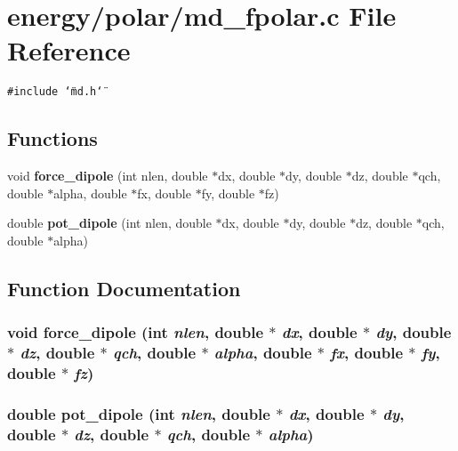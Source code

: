 \section{energy/polar/md\_\-fpolar.c File Reference}
\label{md__fpolar_8c}
{\tt \#include \char`\"{}md.h\char`\"{}}\par
\subsection*{Functions}
\begin{CompactItemize}
\item 
void {\bf force\_\-dipole} (int nlen, double $\ast$dx, double $\ast$dy, double $\ast$dz, double $\ast$qch, double $\ast$alpha, double $\ast$fx, double $\ast$fy, double $\ast$fz)
\item 
double {\bf pot\_\-dipole} (int nlen, double $\ast$dx, double $\ast$dy, double $\ast$dz, double $\ast$qch, double $\ast$alpha)
\end{CompactItemize}


\subsection{Function Documentation}
\subsubsection{\setlength{\rightskip}{0pt plus 5cm}void force\_\-dipole (int {\em nlen}, double $\ast$ {\em dx}, double $\ast$ {\em dy}, double $\ast$ {\em dz}, double $\ast$ {\em qch}, double $\ast$ {\em alpha}, double $\ast$ {\em fx}, double $\ast$ {\em fy}, double $\ast$ {\em fz})}\label{md__fpolar_8c_34a78d33162d4aac2cfa6fc7b3d71307}


\subsubsection{\setlength{\rightskip}{0pt plus 5cm}double pot\_\-dipole (int {\em nlen}, double $\ast$ {\em dx}, double $\ast$ {\em dy}, double $\ast$ {\em dz}, double $\ast$ {\em qch}, double $\ast$ {\em alpha})}\label{md__fpolar_8c_b1e448585d34a7bd674b12487e0fb3db}


